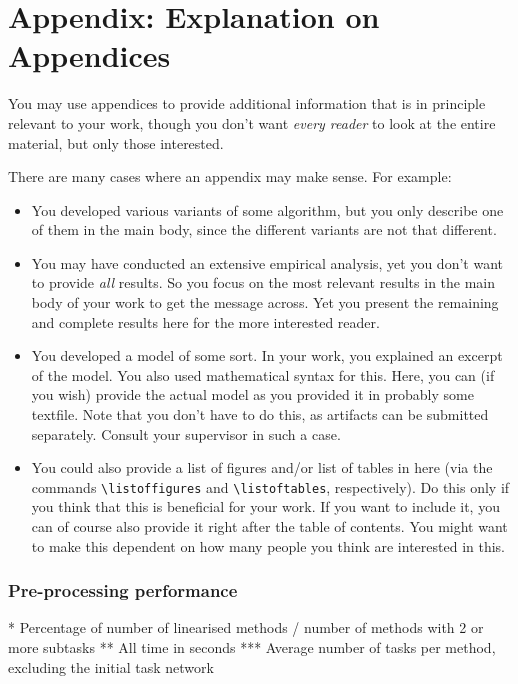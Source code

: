 \chapter{Appendix: Explanation on Appendices}\label{chap:appendix1}

You may use appendices to provide additional information that is in principle relevant to your work, though you don't want \emph{every reader} to look at the entire material, but only those interested.

There are many cases where an appendix may make sense. For example:
\begin{itemize}
  \item You developed various variants of some algorithm, but you only describe one of them in the main body, since the different variants are not that different.
  \item You may have conducted an extensive empirical analysis, yet you don't want to provide \emph{all} results. So you focus on the most relevant results in the main body of your work to get the message across. Yet you present the remaining and complete results here for the more interested reader.
  \item You developed a model of some sort. In your work, you explained an excerpt of the model. You also used mathematical syntax for this. Here, you can (if you wish) provide the actual model as you provided it in probably some textfile. Note that you don't have to do this, as artifacts can be submitted separately. Consult your supervisor in such a case.
  \item You could also provide a list of figures and/or list of tables in here (via the commands \verb!\listoffigures! and \verb!\listoftables!, respectively). Do this only if you think that this is beneficial for your work. If you want to include it, you can of course also provide it right after the table of contents. You might want to make this dependent on how many people you think are interested in this.
\end{itemize}

\subsection{Pre-processing performance}

* Percentage of number of linearised methods / number of methods with 2 or more subtasks \newline 
** All time in seconds \newline 
*** Average number of tasks per method, excluding the initial task network


